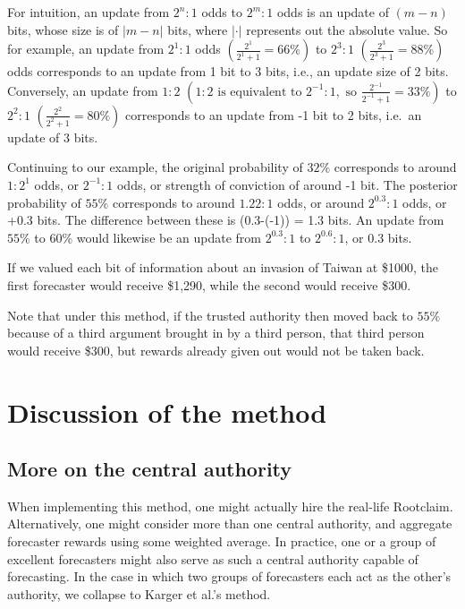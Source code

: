 \documentclass[]{article}
\begin{document}
For intuition, an update from \(2^{n}:1\) odds to \(2^{m}:1\) odds is an
update of \((m-n)\) bits, whose size is of \(|m-n|\) bits, where
\(|\cdot|\) represents out the absolute value. So for example, an update
from \(2^1:1\) odds \(\left(\frac{2^1}{2^1 + 1} = 66\%\right)\) to
\(2^3:1\) \(\left(\frac{2^3}{2^3 + 1} = 88\%\right)\) odds corresponds
to an update from 1 bit to 3 bits, i.e., an update size of 2 bits.
Conversely, an update from \(1:2\)
\(\left(1:2 \text{ is equivalent to } 2^{-1}:1, \text{ so } \frac{2^{-1}}{2^{-1} + 1} = 33\%\right)\)
to \(2^{2}:1\) \(\left(\frac{2^2}{2^2 + 1} = 80\%\right)\) corresponds
to an update from -1 bit to 2 bits, i.e.~an update of 3 bits.

Continuing to our example, the original probability of \(32\%\)
corresponds to around \(1:2^1\) odds, or \(2^{-1}:1\) odds, or strength
of conviction of around -1 bit. The posterior probability of \(55\%\)
corresponds to around \(1.22 : 1\) odds, or around \(2^{0.3} : 1\) odds,
or +0.3 bits. The difference between these is (0.3-(-1)) = 1.3 bits. An
update from \(55\%\) to \(60\%\) would likewise be an update from
\(2^{0.3}:1\) to \(2^{0.6}:1\), or 0.3 bits.

If we valued each bit of information about an invasion of Taiwan at
\$1000, the first forecaster would receive \$1,290, while the second
would receive \$300.

Note that under this method, if the trusted authority then moved back to
\(55\%\) because of a third argument brought in by a third person, that
third person would receive \$300, but rewards already given out would
not be taken back.

\hypertarget{discussion-of-the-method}{%
\section{Discussion of the method}\label{discussion-of-the-method}}

\hypertarget{more-on-the-central-authority}{%
\subsection{More on the central
authority}\label{more-on-the-central-authority}}

When implementing this method, one might actually hire the real-life
Rootclaim. Alternatively, one might consider more than one central
authority, and aggregate forecaster rewards using some weighted average.
In practice, one or a group of excellent forecasters might also serve as
such a central authority capable of forecasting. In the case in which
two groups of forecasters each act as the other's authority, we collapse
to Karger et al.'s method.
\end{document}
